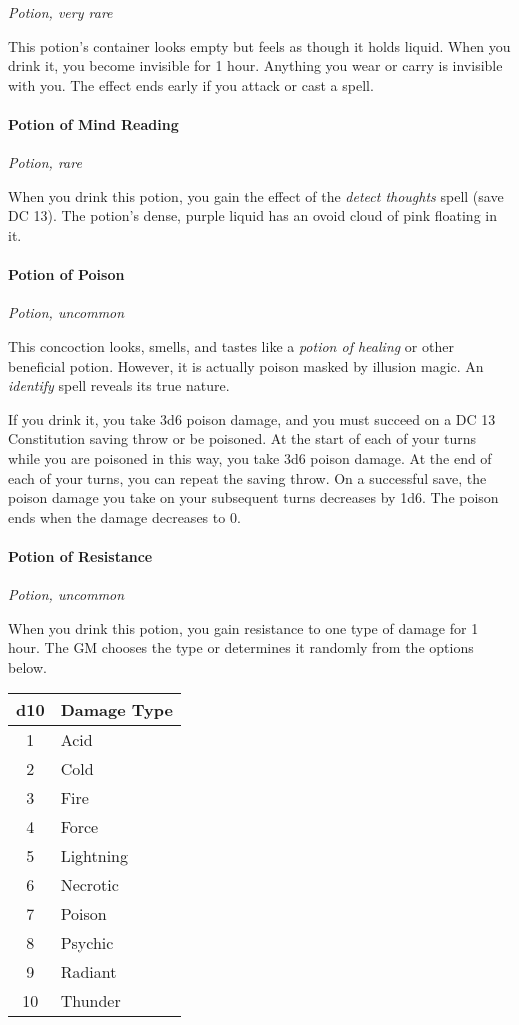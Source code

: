 \documentclass[
]{article}
\begin{document}
\emph{Potion, very rare}

This potion's container looks empty but feels as though it holds liquid.
When you drink it, you become invisible for 1 hour. Anything you wear or
carry is invisible with you. The effect ends early if you attack or cast
a spell.

\hypertarget{potion-of-mind-reading}{%
\paragraph{Potion of Mind Reading}\label{potion-of-mind-reading}}

\emph{Potion, rare}

When you drink this potion, you gain the effect of the \emph{detect
thoughts} spell (save DC 13). The potion's dense, purple liquid has an
ovoid cloud of pink floating in it.

\hypertarget{potion-of-poison}{%
\paragraph{Potion of Poison}\label{potion-of-poison}}

\emph{Potion, uncommon}

This concoction looks, smells, and tastes like a \emph{potion of
healing} or other beneficial potion. However, it is actually poison
masked by illusion magic. An \emph{identify} spell reveals its true
nature.

If you drink it, you take 3d6 poison damage, and you must succeed on a
DC 13 Constitution saving throw or be poisoned. At the start of each of
your turns while you are poisoned in this way, you take 3d6 poison
damage. At the end of each of your turns, you can repeat the saving
throw. On a successful save, the poison damage you take on your
subsequent turns decreases by 1d6. The poison ends when the damage
decreases to 0.

\hypertarget{potion-of-resistance}{%
\paragraph{Potion of Resistance}\label{potion-of-resistance}}

\emph{Potion, uncommon}

When you drink this potion, you gain resistance to one type of damage
for 1 hour. The GM chooses the type or determines it randomly from the
options below.

\begin{longtable}[]{@{}cl@{}}
\toprule
d10 & Damage Type\tabularnewline
\midrule
\endhead
1 & Acid\tabularnewline
2 & Cold\tabularnewline
3 & Fire\tabularnewline
4 & Force\tabularnewline
5 & Lightning\tabularnewline
6 & Necrotic\tabularnewline
7 & Poison\tabularnewline
8 & Psychic\tabularnewline
9 & Radiant\tabularnewline
10 & Thunder\tabularnewline
\bottomrule
\end{longtable}
\end{document}
